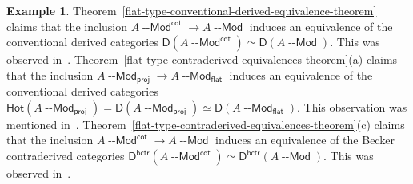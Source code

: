 \documentclass[12pt,a4paper]{amsart}
\newcommand{\+}{\nobreakdash-}
\renewcommand{\:}{\colon}
\newcommand{\rarrow}{\longrightarrow}
\newcommand{\Modl}{{\operatorname{\mathsf{--Mod}}}}
\newcommand{\sD}{\mathsf D}
\newcommand{\Hot}{\mathsf{Hot}}
\newcommand{\proj}{\mathsf{proj}}
\renewcommand{\flat}{\mathsf{flat}}
\renewcommand{\cot}{\mathsf{cot}}
\newcommand{\bctr}{\mathsf{bctr}}
\theoremstyle{plain}
\theoremstyle{definition}
\newtheorem{ex}[thm]{Example}
\begin{document}
\begin{ex}
 Theorem~\ref{flat-type-conventional-derived-equivalence-theorem}
claims that the inclusion $A\Modl^\cot\rarrow A\Modl$ induces
an equivalence of the conventional derived categories
$\sD(A\Modl^\cot)\simeq\sD(A\Modl)$.
 This was observed in~\cite[Theorem~7.17]{Pphil}.
 Theorem~\ref{flat-type-contraderived-equivalences-theorem}(a) claims
that the inclusion $A\Modl_\proj\rarrow A\Modl_\flat$ induces
an equivalence of the conventional derived categories
$\Hot(A\Modl_\proj)=\sD(A\Modl_\proj)\simeq\sD(A\Modl_\flat)$.
 This observation was mentioned in~\cite[Theorem~7.13]{Pphil}.
 Theorem~\ref{flat-type-contraderived-equivalences-theorem}(c) claims
that the inclusion $A\Modl^\cot\rarrow A\Modl$ induces an equivalence
of the Becker contraderived categories
$\sD^\bctr(A\Modl^\cot)\simeq\sD^\bctr(A\Modl)$.
 This was observed in~\cite[Theorem~7.19]{Pphil}.
\end{ex}
\end{document}
